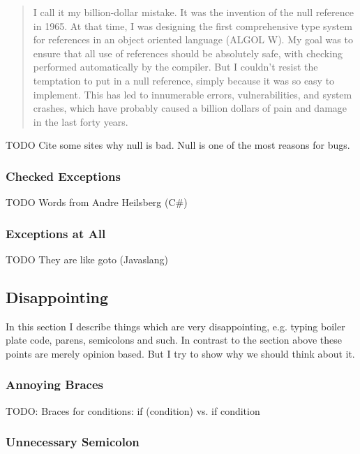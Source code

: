 \documentclass[a4paper,12pt]{article}
\begin{document}
\begin{quotation}
I call it my billion-dollar mistake. It was the invention of the null reference in 1965. At that time, I was designing the first comprehensive type system for references in an object oriented language (ALGOL W). My goal was to ensure that all use of references should be absolutely safe, with checking performed automatically by the compiler. But I couldn't resist the temptation to put in a null reference, simply because it was so easy to implement. This has led to innumerable errors, vulnerabilities, and system crashes, which have probably caused a billion dollars of pain and damage in the last forty years.	
\end{quotation} 

TODO Cite some sites why null is bad. Null is one of the most reasons for bugs.

\subsubsection{Checked Exceptions}

TODO Words from Andre Heilsberg (C\#)

\subsubsection{Exceptions at All}

TODO They are like goto (Javaslang)

\subsection{Disappointing}

In this section I describe things which are very disappointing, e.g. typing boiler plate code, parens, semicolons and such. In contrast to the section above these points are merely opinion based. But I try to show why we should think about it.

\subsubsection{Annoying Braces}

TODO: Braces for conditions: if (condition) vs. if condition

\subsubsection{Unnecessary Semicolon}
\end{document}
